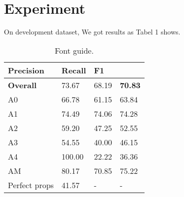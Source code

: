 \documentclass[11pt,a4paper]{article}
\begin{document}
\section{Experiment}

On development dataset, We got results as Tabel 1 shows.
\begin{table}[t!]
  \begin{center}
  \begin{tabular}{|l|l|l|l|}
  \hline  \bf Precision & \bf Recall & \bf F1 \\ \hline
  \bf Overall  &  73.67 &  68.19 &  \bf 70.83 \\
          A0   &  66.78 &  61.15 &  63.84 \\
          A1   &  74.49 &  74.06 &  74.28 \\
          A2   &  59.20 &  47.25 &  52.55 \\
          A3   &  54.55 &  40.00 & 46.15 \\
          A4   &  100.00 &  22.22 &  36.36 \\
          AM   &  80.17 &  70.85 &  75.22 \\
           Perfect props &  41.57 & - & - \\
  \hline
  \end{tabular}
  \end{center}
  \caption{\label{font-table} Font guide. }
  \end{table}


%
%


\end{document}
